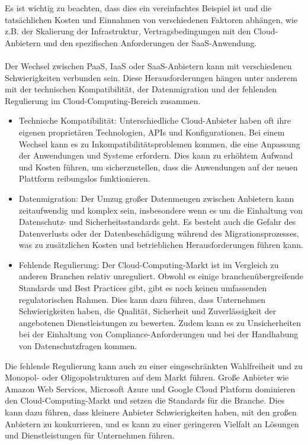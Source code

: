 Es ist wichtig zu beachten, dass dies ein vereinfachtes Beispiel ist und die tatsächlichen Kosten und Einnahmen von verschiedenen Faktoren abhängen, wie z.B. der Skalierung der Infrastruktur, Vertragsbedingungen mit den Cloud-Anbietern und den spezifischen Anforderungen der SaaS-Anwendung.
\\\\
Der Wechsel zwischen PaaS, IaaS oder SaaS-Anbietern kann mit verschiedenen Schwierigkeiten verbunden sein. Diese Herausforderungen hängen unter anderem mit der technischen Kompatibilität, der Datenmigration und der fehlenden Regulierung im Cloud-Computing-Bereich zusammen.
\begin{itemize}
\item Technische Kompatibilität: Unterschiedliche Cloud-Anbieter haben oft ihre eigenen proprietären Technologien, APIs und Konfigurationen. Bei einem Wechsel kann es zu Inkompatibilitätsproblemen kommen, die eine Anpassung der Anwendungen und Systeme erfordern. Dies kann zu erhöhtem Aufwand und Kosten führen, um sicherzustellen, dass die Anwendungen auf der neuen Plattform reibungslos funktionieren.

\item Datenmigration: Der Umzug großer Datenmengen zwischen Anbietern kann zeitaufwendig und komplex sein, insbesondere wenn es um die Einhaltung von Datenschutz- und Sicherheitsstandards geht. Es besteht auch die Gefahr des Datenverlusts oder der Datenbeschädigung während des Migrationsprozesses, was zu zusätzlichen Kosten und betrieblichen Herausforderungen führen kann.

\item Fehlende Regulierung: Der Cloud-Computing-Markt ist im Vergleich zu anderen Branchen relativ unreguliert. Obwohl es einige branchenübergreifende Standards und Best Practices gibt, gibt es noch keinen umfassenden regulatorischen Rahmen. Dies kann dazu führen, dass Unternehmen Schwierigkeiten haben, die Qualität, Sicherheit und Zuverlässigkeit der angebotenen Dienstleistungen zu bewerten. Zudem kann es zu Unsicherheiten bei der Einhaltung von Compliance-Anforderungen und bei der Handhabung von Datenschutzfragen kommen.
\end{itemize}
Die fehlende Regulierung kann auch zu einer eingeschränkten Wahlfreiheit und zu Monopol- oder Oligopolstrukturen auf dem Markt führen. Große Anbieter wie Amazon Web Services, Microsoft Azure und Google Cloud Platform dominieren den Cloud-Computing-Markt und setzen die Standards für die Branche. Dies kann dazu führen, dass kleinere Anbieter Schwierigkeiten haben, mit den großen Anbietern zu konkurrieren, und es kann zu einer geringeren Vielfalt an Lösungen und Dienstleistungen für Unternehmen führen.

